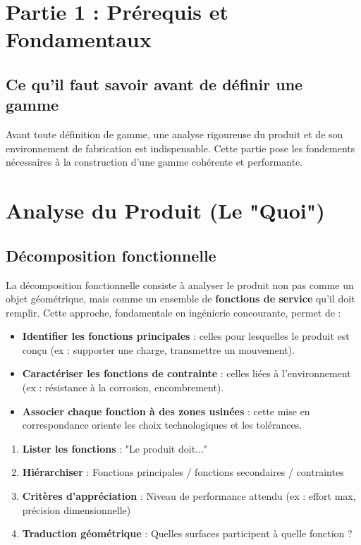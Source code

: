\documentclass{article}
\begin{document}
\section*{Partie 1 : Prérequis et Fondamentaux}
\subsection*{Ce qu'il faut savoir avant de définir une gamme}

Avant toute définition de gamme, une analyse rigoureuse du produit et de son environnement de fabrication est indispensable. Cette partie pose les fondements nécessaires à la construction d'une gamme cohérente et performante.


\section{Analyse du Produit (Le "Quoi")}

\subsection{Décomposition fonctionnelle}

La décomposition fonctionnelle consiste à analyser le produit non pas comme un objet géométrique, mais comme un ensemble de \textbf{fonctions de service} qu'il doit remplir. Cette approche, fondamentale en ingénierie concourante, permet de :

\begin{itemize}
    \item \textbf{Identifier les fonctions principales} : celles pour lesquelles le produit est conçu (ex : supporter une charge, transmettre un mouvement).
    \item \textbf{Caractériser les fonctions de contrainte} : celles liées à l'environnement (ex : résistance à la corrosion, encombrement).
    \item \textbf{Associer chaque fonction à des zones usinées} : cette mise en correspondance oriente les choix technologiques et les tolérances.
\end{itemize}

\begin{tcolorbox}[colback=gray!5!white, colframe=gray!75!black, title=Méthodologie de décomposition]
\begin{enumerate}
    \item \textbf{Lister les fonctions} : "Le produit doit..."
    \item \textbf{Hiérarchiser} : Fonctions principales / fonctions secondaires / contraintes
    \item \textbf{Critères d'appréciation} : Niveau de performance attendu (ex : effort max, précision dimensionnelle)
    \item \textbf{Traduction géométrique} : Quelles surfaces participent à quelle fonction ?
\end{enumerate}
\end{tcolorbox}
\end{document}
